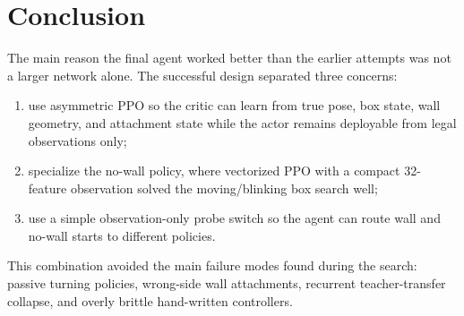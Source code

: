 \documentclass[11pt]{article}
\begin{document}
\section{Conclusion}

The main reason the final agent worked better than the earlier attempts was not a
larger network alone.  The successful design separated three concerns:
\begin{enumerate}
  \item use asymmetric PPO so the critic can learn from true pose, box state, wall
        geometry, and attachment state while the actor remains deployable from legal
        observations only;
  \item specialize the no-wall policy, where vectorized PPO with a compact 32-feature
        observation solved the moving/blinking box search well;
  \item use a simple observation-only probe switch so the agent can route wall and
        no-wall starts to different policies.
\end{enumerate}
This combination avoided the main failure modes found during the search: passive
turning policies, wrong-side wall attachments, recurrent teacher-transfer collapse,
and overly brittle hand-written controllers.
\end{document}
